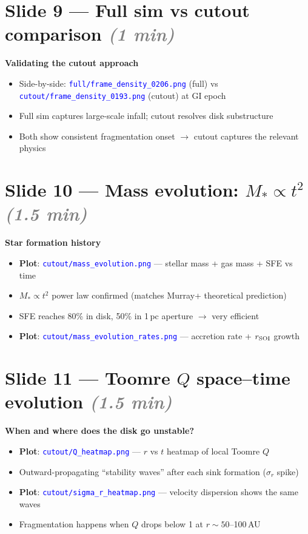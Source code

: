 \documentclass[12pt]{article}
\newcommand{\plotref}[1]{\textcolor{blue}{\texttt{#1}}}
\newcommand{\timing}[1]{\textcolor{gray}{\textit{(#1)}}}
\begin{document}
\section*{Slide 9 --- Full sim vs cutout comparison \timing{1 min}}

\textbf{Validating the cutout approach}

\begin{itemize}
  \item Side-by-side: \plotref{full/frame\_density\_0206.png} (full)
        vs \plotref{cutout/frame\_density\_0193.png} (cutout) at GI epoch
  \item Full sim captures large-scale infall; cutout resolves disk
        substructure
  \item Both show consistent fragmentation onset $\to$ cutout captures
        the relevant physics
\end{itemize}

\section*{Slide 10 --- Mass evolution: $M_* \propto t^2$ \timing{1.5 min}}

\textbf{Star formation history}

\begin{itemize}
  \item \textbf{Plot}: \plotref{cutout/mass\_evolution.png} ---
        stellar mass + gas mass + SFE vs time
  \item $M_* \propto t^2$ power law confirmed (matches Murray+
        theoretical prediction)
  \item SFE reaches 80\% in disk, 50\% in 1\,pc aperture $\to$ very
        efficient
  \item \textbf{Plot}: \plotref{cutout/mass\_evolution\_rates.png} ---
        accretion rate + $r_{\rm SOI}$ growth
\end{itemize}

\section*{Slide 11 --- Toomre $Q$ space--time evolution \timing{1.5 min}}

\textbf{When and where does the disk go unstable?}

\begin{itemize}
  \item \textbf{Plot}: \plotref{cutout/Q\_heatmap.png} --- $r$ vs $t$
        heatmap of local Toomre $Q$
  \item Outward-propagating ``stability waves'' after each sink
        formation ($\sigma_r$ spike)
  \item \textbf{Plot}: \plotref{cutout/sigma\_r\_heatmap.png} ---
        velocity dispersion shows the same waves
  \item Fragmentation happens when $Q$ drops below 1 at
        $r \sim 50$--100\,AU
\end{itemize}
\end{document}
